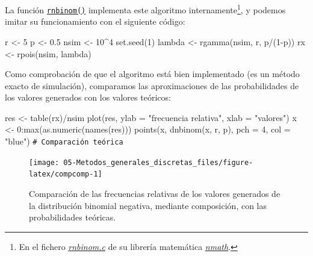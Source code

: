 \documentclass[
  10pt,
]{book}
\newenvironment{Shaded}{\begin{snugshade}}{\end{snugshade}}
\newcommand{\AttributeTok}[1]{\textcolor[rgb]{0.77,0.63,0.00}{#1}}
\newcommand{\CommentTok}[1]{\textcolor[rgb]{0.56,0.35,0.01}{\textit{#1}}}
\newcommand{\DecValTok}[1]{\textcolor[rgb]{0.00,0.00,0.81}{#1}}
\newcommand{\FloatTok}[1]{\textcolor[rgb]{0.00,0.00,0.81}{#1}}
\newcommand{\FunctionTok}[1]{\textcolor[rgb]{0.00,0.00,0.00}{#1}}
\newcommand{\NormalTok}[1]{#1}
\newcommand{\OtherTok}[1]{\textcolor[rgb]{0.56,0.35,0.01}{#1}}
\newcommand{\SpecialCharTok}[1]{\textcolor[rgb]{0.00,0.00,0.00}{#1}}
\newcommand{\StringTok}[1]{\textcolor[rgb]{0.31,0.60,0.02}{#1}}
\theoremstyle{break}
\theoremstyle{nonumberplain}
\renewcommand{\CommentTok}[1]{\textcolor[rgb]{0.41,0.41,0.41}{\texttt{#1}}}
\let\oldfootnote\footnote
\renewcommand\footnote[1]{\oldfootnote{\hspace{2mm}#1}}
\begin{document}
La función \href{https://rdrr.io/r/stats/NegBinomial.html}{\texttt{rnbinom()}} implementa este algoritmo internamente\footnote{En el fichero \href{https://svn.r-project.org/R/trunk/src/nmath/rnbinom.c}{\emph{rnbinom.c}} de su librería matemática \href{https://svn.r-project.org/R/trunk/src/nmath}{\emph{nmath}}.},
y podemos imitar su funcionamiento con el siguiente código:

\begin{Shaded}
\begin{Highlighting}[]
\NormalTok{r }\OtherTok{\textless{}{-}} \DecValTok{5}
\NormalTok{p }\OtherTok{\textless{}{-}} \FloatTok{0.5}
\NormalTok{nsim }\OtherTok{\textless{}{-}} \DecValTok{10}\SpecialCharTok{\^{}}\DecValTok{4}
\FunctionTok{set.seed}\NormalTok{(}\DecValTok{1}\NormalTok{)}
\NormalTok{lambda }\OtherTok{\textless{}{-}} \FunctionTok{rgamma}\NormalTok{(nsim, r, p}\SpecialCharTok{/}\NormalTok{(}\DecValTok{1}\SpecialCharTok{{-}}\NormalTok{p))}
\NormalTok{rx }\OtherTok{\textless{}{-}} \FunctionTok{rpois}\NormalTok{(nsim, lambda)}
\end{Highlighting}
\end{Shaded}

Como comprobación de que el algoritmo está bien implementado (es un método exacto de simulación), comparamos las aproximaciones de las probabilidades de los valores generados con los valores teóricos:

\begin{Shaded}
\begin{Highlighting}[]
\NormalTok{res }\OtherTok{\textless{}{-}} \FunctionTok{table}\NormalTok{(rx)}\SpecialCharTok{/}\NormalTok{nsim}
\FunctionTok{plot}\NormalTok{(res, }\AttributeTok{ylab =} \StringTok{"frecuencia relativa"}\NormalTok{, }\AttributeTok{xlab =} \StringTok{"valores"}\NormalTok{)}
\NormalTok{x }\OtherTok{\textless{}{-}} \DecValTok{0}\SpecialCharTok{:}\FunctionTok{max}\NormalTok{(}\FunctionTok{as.numeric}\NormalTok{(}\FunctionTok{names}\NormalTok{(res)))}
\FunctionTok{points}\NormalTok{(x, }\FunctionTok{dnbinom}\NormalTok{(x, r, p), }\AttributeTok{pch =} \DecValTok{4}\NormalTok{, }\AttributeTok{col =} \StringTok{"blue"}\NormalTok{)  }\CommentTok{\# Comparación teórica}
\end{Highlighting}
\end{Shaded}

\begin{figure}[!htbp]

{\centering \texttt{[image: 05-Metodos\_generales\_discretas\_files/figure-latex/compcomp-1]} 

}

\caption{Comparación de las frecuencias relativas de los valores generados de la distribución binomial negativa, mediante composición, con las probabilidades teóricas.}\label{fig:compcomp}
\end{figure}
\end{document}
